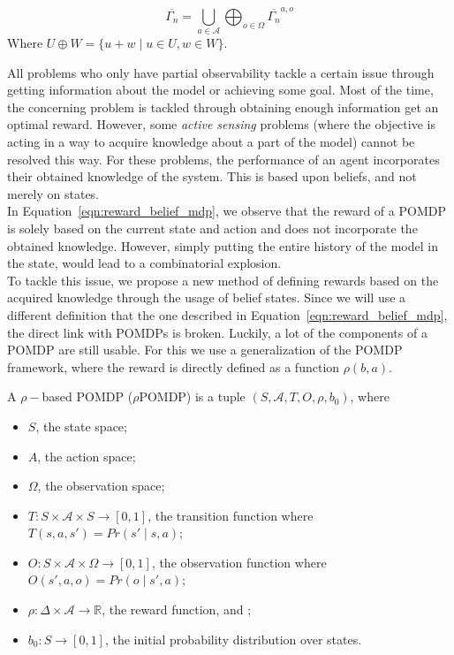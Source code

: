 \begin{equation}
	\overline{\Gamma_n} = \bigcup_{a\in\mathcal{A}}\bigoplus_{o\in \Omega}\overline{\Gamma_n}^{a,o}
\end{equation}
Where $U\oplus W = \{u+w\mid u\in U, w\in W\}$.


All problems who only have partial observability tackle a certain issue through getting information about the model or achieving some goal. Most of the time, the concerning problem is tackled through obtaining enough information get an optimal reward. However, some \textit{active sensing} problems (where the objective is acting in a way to acquire knowledge about a part of the model) cannot be resolved this way. For these problems, the performance of an agent incorporates their obtained knowledge of the system. This is based upon beliefs, and not merely on states. \\

In Equation~\ref{eqn:reward_belief_mdp}, we observe that the reward of a POMDP is solely based on the current state and action and does not incorporate the obtained knowledge. However, simply putting the entire history of the model in the state, would lead to a combinatorial explosion. \\

To tackle this issue, we propose a new method of defining rewards based on the acquired knowledge through the usage of belief states. Since we will use a different definition that the one described in Equation~\ref{eqn:reward_belief_mdp}, the direct link with POMDPs is broken. Luckily, a lot of the components of a POMDP are still usable. For this we use a generalization of the POMDP framework, where the reward is directly defined as a function $\rho(b,a)$.

\begin{definition}
	A $\rho-$based POMDP ($\rho$POMDP) is a tuple $(S,\mathcal{A},T,O,\rho,b_0)$, where
		\begin{itemize}
		\item $S$, the state space;
		\item $A$, the action space;
		\item $\Omega$, the observation space;
		\item $T:S\times \mathcal{A} \times S \to [0,1]$, the transition function where
		$T(s,a,s')=Pr(s'\mid s,a)$;
		\item $O:S\times \mathcal{A} \times \Omega \to [0,1]$, the observation function where
		$O(s',a,o)= Pr(o\mid s',a)$;
		\item $\rho: \Delta \times \mathcal{A} \to \mathds{R}$, the reward function, and ;
		\item $b_0 : S \to [0,1]$, the initial probability distribution over states.
	\end{itemize}
\end{definition}

